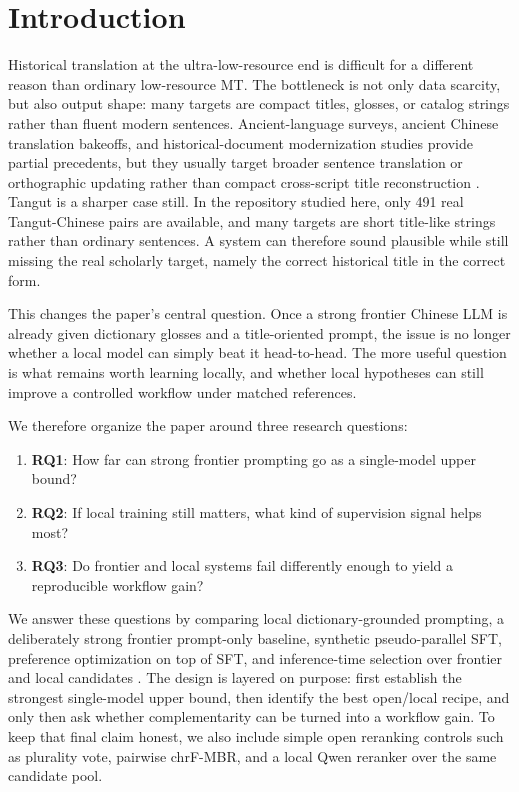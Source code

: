 \section{Introduction}

Historical translation at the ultra-low-resource end is difficult for a different reason than ordinary low-resource MT. The bottleneck is not only data scarcity, but also output shape: many targets are compact titles, glosses, or catalog strings rather than fluent modern sentences. Ancient-language surveys, ancient Chinese translation bakeoffs, and historical-document modernization studies provide partial precedents, but they usually target broader sentence translation or orthographic updating rather than compact cross-script title reconstruction \cite{sommerschield2023ancient, wang2023evahanoverview, domingo2018backtranslation}. Tangut is a sharper case still. In the repository studied here, only 491 real Tangut-Chinese pairs are available, and many targets are short title-like strings rather than ordinary sentences. A system can therefore sound plausible while still missing the real scholarly target, namely the correct historical title in the correct form.

This changes the paper's central question. Once a strong frontier Chinese LLM is already given dictionary glosses and a title-oriented prompt, the issue is no longer whether a local model can simply beat it head-to-head. The more useful question is what remains worth learning locally, and whether local hypotheses can still improve a controlled workflow under matched references.

We therefore organize the paper around three research questions:
\begin{enumerate}
\item \textbf{RQ1}: How far can strong frontier prompting go as a single-model upper bound?
\item \textbf{RQ2}: If local training still matters, what kind of supervision signal helps most?
\item \textbf{RQ3}: Do frontier and local systems fail differently enough to yield a reproducible workflow gain?
\end{enumerate}

We answer these questions by comparing local dictionary-grounded prompting, a deliberately strong frontier prompt-only baseline, synthetic pseudo-parallel SFT, preference optimization on top of SFT, and inference-time selection over frontier and local candidates \cite{arthur2016lexicons, sennrich2016monolingual, rafailov2023dpo}. The design is layered on purpose: first establish the strongest single-model upper bound, then identify the best open/local recipe, and only then ask whether complementarity can be turned into a workflow gain. To keep that final claim honest, we also include simple open reranking controls such as plurality vote, pairwise chrF-MBR, and a local Qwen reranker over the same candidate pool.

